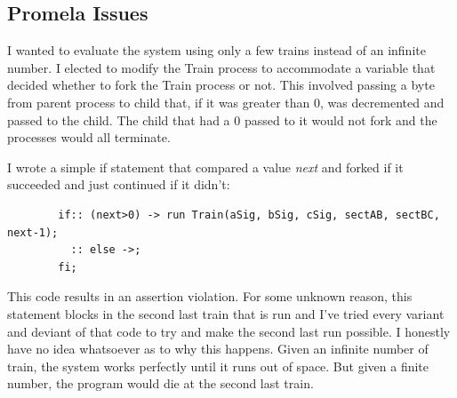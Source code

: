 \documentclass[10pt]{article}
\begin{document}
    \subsection{Promela Issues}
      I wanted to evaluate the system using only a few trains instead of an
      infinite number. I elected to modify the Train process to accommodate
      a variable that decided whether to fork the Train process or not. This
      involved passing a byte from parent process to child that, if it was
      greater than 0, was decremented and passed to the child. The child that
      had a 0 passed to it would not fork and the processes would all
      terminate.

      I wrote a simple if statement that compared a value \textit{next} and
      forked if it succeeded and just continued if it didn't:

      \begin{verbatim}
        if:: (next>0) -> run Train(aSig, bSig, cSig, sectAB, sectBC, next-1);
          :: else ->;  
        fi;  
      \end{verbatim}
   
      This code results in an assertion violation. For some unknown reason,
      this statement blocks in the second last train that is run and I've
      tried every variant and deviant of that code to try and make the
      second last run possible. 
      I honestly have no idea whatsoever as to why this happens. Given an
      infinite number of train, the system works perfectly until it runs
      out of space. But given a finite number, the program would die at the
      second last train.
\end{document}
